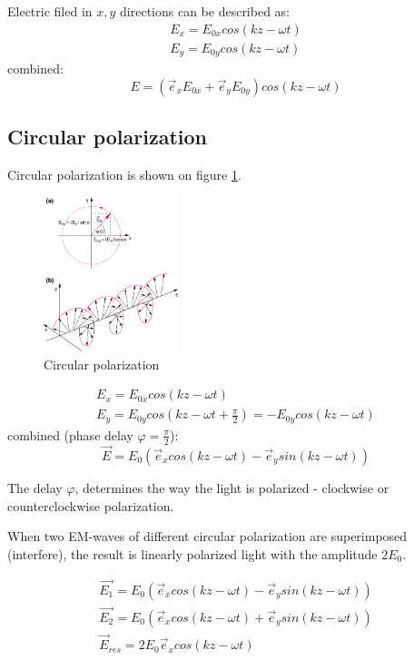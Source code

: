 Electric filed in $x,y$ directions can be described as:
\begin{align}
    E_x = E_{0x} cos(kz - \omega t)\\
    E_y = E_{0y} cos(kz - \omega t)
\end{align}
combined:
\begin{equation}
    E = (\vec{e}_x E_{0x} + \vec{e}_y E_{0y}) cos(kz - \omega t)
\end{equation}



\subsection{Circular polarization}
Circular polarization is shown on figure \ref{fig:cirpol}.
\begin{figure}[h!]
    \centering
    \includegraphics[width=0.35\textwidth]{slike/circpol.png}
    \caption{Circular polarization}
    \label{fig:cirpol}
\end{figure}

\begin{align}
    E_x = E_{0x} cos(kz - \omega t)\\
    E_y = E_{0y} cos(kz - \omega t + \frac{\pi}{2}) =  -E_{0y} cos(kz - \omega t)
\end{align}
combined (phase delay $\varphi = \frac{\pi}{2}$):
\begin{equation}
    \vec{E} = E_0 (\vec{e}_x cos(kz - \omega t) - \vec{e}_y sin(kz - \omega t))
\end{equation}

The delay $\varphi$, determines the way the light is polarized - clockwise or counterclockwise
polarization. 

When two EM-waves of different circular polarization are superimposed (interfere),
the result is linearly polarized light with the amplitude $2 E_0$.

\begin{align}
    \vec{E_1} = E_0 (\vec{e}_x cos(kz - \omega t) - \vec{e}_y sin(kz - \omega t))\\
    \vec{E_2} = E_0 (\vec{e}_x cos(kz - \omega t) + \vec{e}_y sin(kz - \omega t))\\
    \vec{E}_{res} = 2 E_0 \vec{e}_x cos(kz - \omega t)
\end{align}

